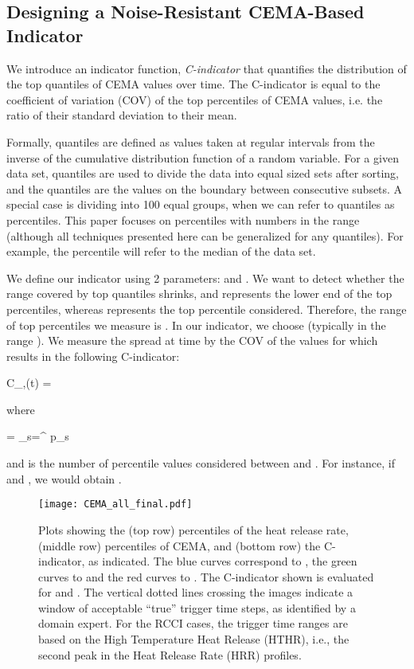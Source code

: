 \documentclass{sig-alternate}
\newcommand{\cmetric}{C}
\newcommand{\be}{}
\begin{document}
\subsection{Designing a Noise-Resistant CEMA-Based Indicator}
\label{sec:indicator}
We introduce an indicator function, \emph{\cmetric-indicator} that quantifies
the distribution of the top quantiles of CEMA values over time. The
\cmetric-indicator is equal to the coefficient of variation (COV) of the top
percentiles of CEMA values, i.e. the ratio of their standard deviation to
their mean. 

Formally, quantiles are defined as  values taken at regular intervals from the
inverse of the cumulative distribution function of a random variable. For a
given data set, quantiles are used to divide the data into equal sized sets 
after sorting, and the quantiles are the values on the boundary between
consecutive subsets.  A special case is dividing into 100 equal groups, when we can
refer to quantiles as percentiles.  This paper focuses on percentiles with
numbers in the  range (although all techniques presented here can be
generalized for any quantiles). For example, the  percentile will refer to
the median of the data set. 
 
We define our indicator using 2 parameters:  and
.  
We  want to detect whether the range
covered by top quantiles shrinks, and  represents the lower end of the
top percentiles, whereas  represents the top percentile considered. Therefore, the  range of top percentiles we  measure is
.  In our indicator, we choose  (typically in the range ). We measure the spread at time
 by the COV of the  values for  which
results in the following \cmetric-indicator:
\be
\cmetric_{\alpha,\beta}(t) = 
\label{eq:cmetric}
\ee

\noindent where
\be
\mu =  \sum_{s=\alpha}^{\beta} p_s
\label{eq:mu}
\ee

\noindent and  is the number of percentile values considered between  and
. For instance, if  and , we would obtain
.

\begin{figure}[ht]
\begin{center}
\hspace*{-5ex}\texttt{[image: CEMA\_all\_final.pdf]}
\caption{\label{fig:CEMA} Plots showing the (top row) percentiles of the
heat release rate, (middle row) percentiles of CEMA, and (bottom row) the  \cmetric-indicator, as indicated.  The blue curves correspond to , the green curves to  and the red curves to . The \cmetric-indicator shown is
evaluated for  and . The vertical dotted lines crossing the images indicate a window of
acceptable ``true'' trigger time steps, as identified by a domain expert.
For the RCCI cases, the trigger time ranges are based on the High Temperature
Heat Release (HTHR), i.e., the second peak in the Heat Release Rate (HRR) profiles.
}
\end{center}
\end{figure}
\end{document}
